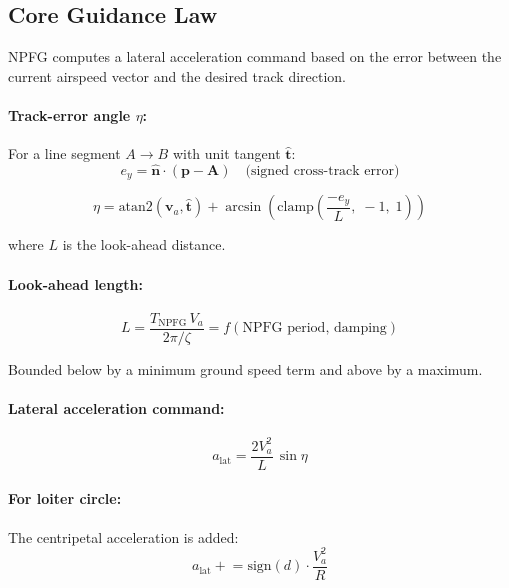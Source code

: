 \documentclass[12pt,a4paper]{article}
\begin{document}
\subsection{Core Guidance Law}

NPFG computes a lateral acceleration command based on the error between
the current airspeed vector and the desired track direction.

\paragraph{Track-error angle $\eta$:}
For a line segment $A \to B$ with unit tangent $\hat{\mathbf{t}}$:
\begin{equation}
  e_y = \hat{\mathbf{n}} \cdot (\mathbf{p} - \mathbf{A})
  \quad\text{(signed cross-track error)}
\end{equation}

\begin{equation}
  \eta = \text{atan2}(\mathbf{v}_a, \hat{\mathbf{t}}) + \arcsin\!\left(
    \text{clamp}\!\left(\frac{-e_y}{L},\;-1,\;1\right)
  \right)
\end{equation}

where $L$ is the look-ahead distance.

\paragraph{Look-ahead length:}
\begin{equation}
  L = \frac{T_{\text{NPFG}}\,V_a}{2\pi / \zeta} = f(\text{NPFG period, damping})
\end{equation}

Bounded below by a minimum ground speed term and above by a maximum.

\paragraph{Lateral acceleration command:}
\begin{equation}
  a_{\text{lat}} = \frac{2V_a^2}{L}\,\sin\eta
\end{equation}

\paragraph{For loiter circle:} The centripetal acceleration is added:
\begin{equation}
  a_{\text{lat}} \mathrel{+}= \text{sign}(d) \cdot \frac{V_a^2}{R}
\end{equation}
\end{document}
